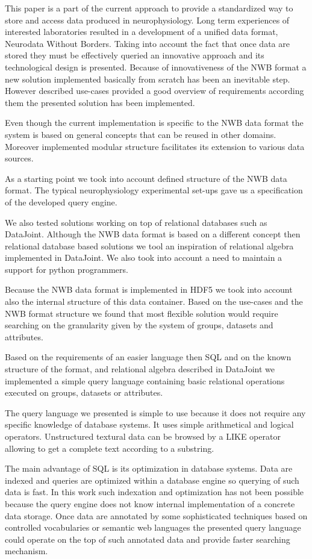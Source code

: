 \documentclass[utf8]{frontiersSCNS} %
\begin{document}
This paper is a part of the current approach to provide a standardized way to store and access data produced in neurophysiology. Long term experiences of interested laboratories resulted in a development of a unified data format, Neurodata Without Borders. Taking into account the fact that once data are stored they must be effectively queried an innovative approach and its technological design is presented. Because of innovativeness of the NWB format a new solution implemented basically from scratch has been an inevitable step. However described use-cases provided a good overview of requirements according them the presented solution has been implemented.

Even though the current implementation is specific to the NWB data format the system is based on general concepts that can be reused in other domains. Moreover implemented modular structure facilitates its extension to various data sources.

As a starting point we took into account defined structure of the NWB data format. The typical neurophysiology experimental set-ups gave us a specification of the developed query engine. 

We also tested solutions working on top of relational databases such as DataJoint. Although the NWB data format is based on a different concept then relational database based solutions we tool an inspiration of relational algebra implemented in DataJoint. We also took into account a need to maintain a support for python programmers. 

Because the NWB data format is implemented in HDF5 we took into account also the internal structure of this data container. Based on the use-cases and the NWB format structure we found that most flexible solution would require searching on the granularity given by the system of groups, datasets and attributes.

Based on the requirements of an easier language then SQL and on the known structure of the format, and relational algebra described in DataJoint we implemented a simple query language containing basic relational operations executed on groups, datasets or attributes.

The query language we presented is simple to use because it does not require any specific knowledge of database systems. It uses simple arithmetical and logical operators. Unstructured textural data can be browsed by a LIKE operator allowing to get a complete text according to a substring. 

The main advantage of SQL is its optimization in database systems. Data are indexed and queries are optimized within a database engine so querying of such data is fast. In this work such indexation and optimization has not been possible because the query engine does not know internal implementation of a concrete data storage. Once data are annotated by some sophisticated techniques based on controlled vocabularies or semantic web languages the presented query language could operate on the top of such annotated data and provide faster searching mechanism.
\end{document}
